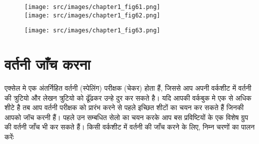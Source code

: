 \begin{figure}[H]
\centering
\texttt{[image: src/images/chapter1\_fig61.png]}\\[4pt]
\texttt{[image: src/images/chapter1\_fig62.png]}
\end{figure}
\begin{figure}[H]
\centering
\texttt{[image: src/images/chapter1\_fig63.png]}
\end{figure}

\section{वर्तनी जाँच करना}\label{id-1.39}

एक्सेल मे एक अंतर्निहित वर्तनी (स्पेलिंग) परीक्षक (चेकर) होता हैं, जिससे आप अपनी वर्कशीट में वर्तनी की त्रुटियो और लेखन त्रुटियो को ढूॅंढकर उन्हे दुर कर सकते है। यदि आपकी वर्कबुक मे एक से अधिक शीटे है तब आप वर्तनी परीक्षक को प्रारंभ करने से पहले इच्छित शीटों का चयन कर सकते हैं जिनकी आपको जॉच करनी हैं। पहले उन सम्बधित सेलो का चयन करके आप बस प्रविष्टियों के एक विशेष ग्रुप की वर्तनी जाँच भी कर सकते हैं। किसी वर्कशीट में वर्तनी की जाँच करने के लिए, निम्न चरणों का पालन करेंः

